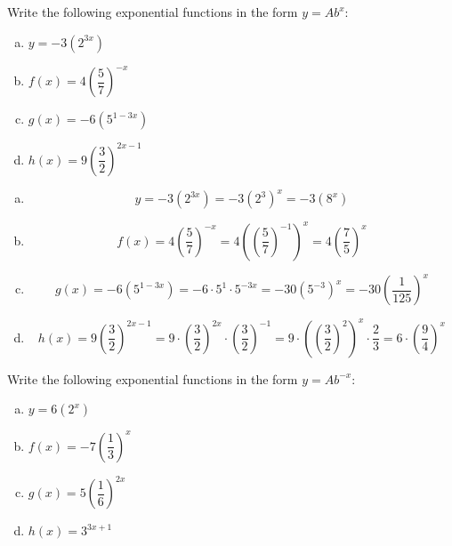 \documentclass[11pt,letterpaper]{article}
\begin{document}

 Write the following exponential functions in the form $y= Ab^x$:
	\begin{enumerate}[(a)]
	\item $y= -3(2^{3x})$
	\item $f(x)= 4 \left( \dfrac{5}{7} \right)^{-x}$
	\item $g(x)= -6 (5^{1 - 3x})$
	\item $h(x)= 9 \left( \dfrac{3}{2} \right)^{2x - 1}$
	\end{enumerate} \pspace

\sol
\begin{enumerate}[(a)]
\item 
	\[
	y= -3(2^{3x})= -3 (2^3)^x= -3 (8^x)
	\] \pspace

\item 
	\[
	f(x)= 4 \left( \dfrac{5}{7} \right)^{-x}= 4 \left( \left( \dfrac{5}{7}\right)^{-1} \right)^x= 4 \left( \dfrac{7}{5} \right)^x
	\] \pspace

\item 
	\[
	g(x)= -6 (5^{1 - 3x})= -6 \cdot 5^1 \cdot 5^{-3x}= -30 (5^{-3})^x= -30 \left( \dfrac{1}{125} \right)^x
	\] \pspace

\item 
	\[
	h(x)= 9 \left( \dfrac{3}{2} \right)^{2x - 1}= 9 \cdot \left( \dfrac{3}{2} \right)^{2x} \cdot \left( \dfrac{3}{2} \right)^{-1}= 9 \cdot \left( \left( \dfrac{3}{2} \right)^2 \right)^x \cdot \dfrac{2}{3}= 6 \cdot \left( \dfrac{9}{4} \right)^x 
	\]
\end{enumerate}



\newpage



 Write the following exponential functions in the form $y= Ab^{-x}$:
	\begin{enumerate}[(a)]
	\item $y= 6 (2^x)$
	\item $f(x)= -7 \left( \dfrac{1}{3} \right)^x$
	\item $g(x)= 5 \left( \dfrac{1}{6} \right)^{2x}$
	\item $h(x)= 3^{3x + 1}$
	\end{enumerate} \pspace
\end{document}
